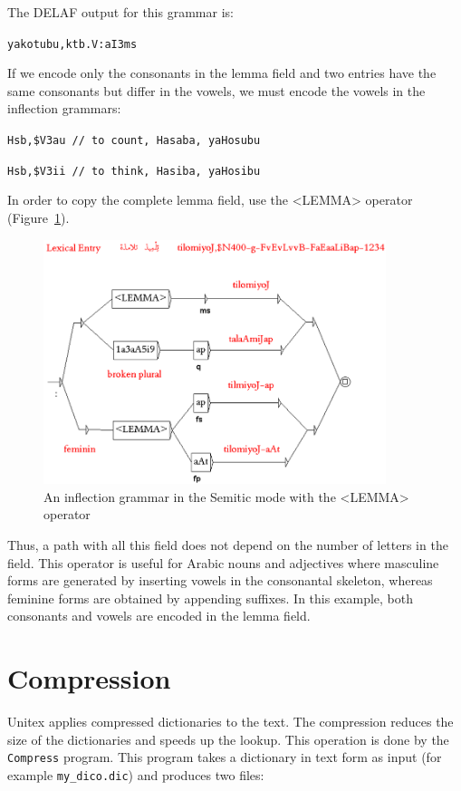 \bigskip
\noindent The DELAF output for this grammar is: 
  
\verb+yakotubu,ktb.V:aI3ms+

\bigskip
\noindent If we encode only the consonants in the lemma field and  two entries have the same consonants
but differ in the vowels, we must encode the vowels in the inflection grammars:

\verb+Hsb,$V3au	// to count, Hasaba, yaHosubu+

\verb+Hsb,$V3ii	// to think, Hasiba, yaHosibu+

\bigskip
\noindent In order to copy the complete lemma field, use the <LEMMA> operator (Figure~\ref{LEMMA-operator}).

\begin{figure}[!ht]
\begin{center}
\includegraphics[width=10cm]{resources/img/fig3-LEMMA-operator.png}
\caption{An inflection grammar in the Semitic mode with the <LEMMA> operator\label{LEMMA-operator}}
\end{center}
\end{figure}

\noindent Thus, a path with all this field does not depend on the number of letters in the field. This operator is useful for
Arabic nouns and adjectives where masculine forms are generated by inserting vowels in the consonantal skeleton, whereas feminine forms are obtained by appending suffixes. In this example, both consonants and vowels are encoded in the lemma field.

\section{Compression}

Unitex applies compressed dictionaries to the text. The compression reduces the
size of the dictionaries and speeds up the lookup. This operation is done by the
\verb+Compress+ program. This program takes a dictionary in text form 
as input (for example \verb+my_dico.dic+) and produces two files:

